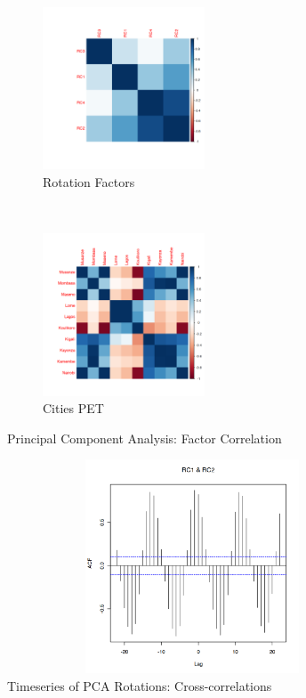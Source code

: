 \documentclass[12pt,a4paper]{article}
\begin{document}
\begin{figure}[!h]
    \centering
    \begin{subfigure}[t]{0.5\textwidth}
        \centering
        \includegraphics[height=1.9in]{./gaphics/q003_a.png}
        \caption{Rotation Factors}
    \end{subfigure}%
    ~ 
    \begin{subfigure}[t]{0.5\textwidth}
        \centering
        \includegraphics[height=1.9in]{./gaphics/q003_b.png}
        \caption{Cities PET}
    \end{subfigure}
    \caption{Principal Component Analysis: Factor Correlation}
\end{figure}

\begin{figure}[!h]
                 \centering
                 \includegraphics[width=0.98\textwidth,height=180pt]{./gaphics/q003_c.png}
\caption{Timeseries of PCA Rotations: Cross-correlations} 
\label{fig2}
\end{figure}
\end{document}
